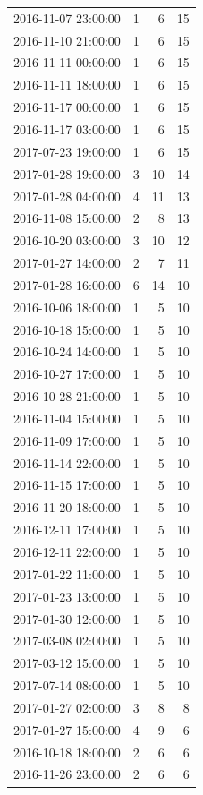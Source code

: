 \begin{tabular}{lrrr}
2016-11-07 23:00:00 & 1 & 6 & 15 \\
2016-11-10 21:00:00 & 1 & 6 & 15 \\
2016-11-11 00:00:00 & 1 & 6 & 15 \\
2016-11-11 18:00:00 & 1 & 6 & 15 \\
2016-11-17 00:00:00 & 1 & 6 & 15 \\
2016-11-17 03:00:00 & 1 & 6 & 15 \\
2017-07-23 19:00:00 & 1 & 6 & 15 \\
2017-01-28 19:00:00 & 3 & 10 & 14 \\
2017-01-28 04:00:00 & 4 & 11 & 13 \\
2016-11-08 15:00:00 & 2 & 8 & 13 \\
2016-10-20 03:00:00 & 3 & 10 & 12 \\
2017-01-27 14:00:00 & 2 & 7 & 11 \\
2017-01-28 16:00:00 & 6 & 14 & 10 \\
2016-10-06 18:00:00 & 1 & 5 & 10 \\
2016-10-18 15:00:00 & 1 & 5 & 10 \\
2016-10-24 14:00:00 & 1 & 5 & 10 \\
2016-10-27 17:00:00 & 1 & 5 & 10 \\
2016-10-28 21:00:00 & 1 & 5 & 10 \\
2016-11-04 15:00:00 & 1 & 5 & 10 \\
2016-11-09 17:00:00 & 1 & 5 & 10 \\
2016-11-14 22:00:00 & 1 & 5 & 10 \\
2016-11-15 17:00:00 & 1 & 5 & 10 \\
2016-11-20 18:00:00 & 1 & 5 & 10 \\
2016-12-11 17:00:00 & 1 & 5 & 10 \\
2016-12-11 22:00:00 & 1 & 5 & 10 \\
2017-01-22 11:00:00 & 1 & 5 & 10 \\
2017-01-23 13:00:00 & 1 & 5 & 10 \\
2017-01-30 12:00:00 & 1 & 5 & 10 \\
2017-03-08 02:00:00 & 1 & 5 & 10 \\
2017-03-12 15:00:00 & 1 & 5 & 10 \\
2017-07-14 08:00:00 & 1 & 5 & 10 \\
2017-01-27 02:00:00 & 3 & 8 & 8 \\
2017-01-27 15:00:00 & 4 & 9 & 6 \\
2016-10-18 18:00:00 & 2 & 6 & 6 \\
2016-11-26 23:00:00 & 2 & 6 & 6 \\

\end{tabular}
